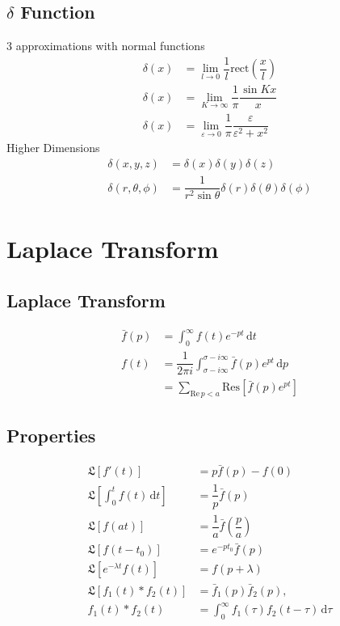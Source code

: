 \documentclass[10pt, a4paper]{article}
\def\d{\,\mathrm{d}}
\def\epsilon{\varepsilon}
\def\Res{\mathrm{Res}}
\def\L{\mathfrak{L}}
\begin{document}
\begin{multicols}{2}
	\subsection{$\delta$ Function}
	3 approximations with normal functions
		\begin{align}
			\delta(x) &= \lim\limits_{l\rightarrow0}\dfrac{1}{l}\mathrm{rect}\left(\dfrac{x}{l}\right)\\
			\delta(x) &= \lim\limits_{K\rightarrow\infty}\dfrac{1}{\pi}\dfrac{\sin Kx}{x}\\
			\delta(x) &= \lim\limits_{\epsilon\rightarrow0}\dfrac{1}{\pi}\dfrac{\epsilon}{\epsilon^2 + x^2}
		\end{align}
	Higher Dimensions
		\begin{align}
			\delta(x,y,z) &= \delta(x)\delta(y)\delta(z)\\
			\delta(r,\theta,\phi) &= \dfrac{1}{r^2\sin\theta}\delta(r)\delta(\theta)\delta(\phi)
		\end{align}
	
\section{Laplace Transform}

	\subsection{Laplace Transform}
		\begin{align}
			\bar{f}(p) &= \int_{0}^{\infty}f(t)e^{-pt}\d t\\
			f(t) &= \dfrac{1}{2\pi i}\int_{\sigma-i\infty}^{\sigma-i\infty}\bar{f}(p)e^{pt}\d p\\
			&= \sum_{\mathrm{Re}\,p<a} \Res[\bar{f}(p)e^{pt}]
		\end{align}
	
	\subsection{Properties}
		\begin{align}
			\L[f'(t)] &= p\bar{f}(p) - f(0)\\
			\L[\int^t_0f(t)\d t] &= \dfrac{1}{p}\bar{f}(p)\\
			\L[f(at)] &= \dfrac{1}{a}\bar{f}\left(\dfrac{p}{a}\right)\\
			\L[f(t-t_0)] &= e^{-p t_0}\bar{f}(p)\\
			\L[e^{-\lambda t}f(t)] &= f(p + \lambda)\\
			\L[f_1(t)*f_2(t)] &= \bar{f}_1(p) \bar{f}_2(p), \\
			f_1(t)*f_2(t) &= \int_{0}^{\infty}f_1(\tau)f_2(t-\tau)\d\tau
		\end{align}
		

\end{multicols}
\end{document}
